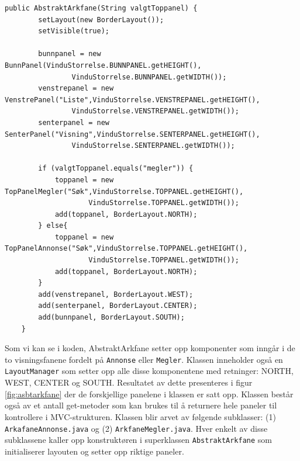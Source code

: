 \begin{lstlisting}[caption=Konstruktør til \texttt{AbstraktArkfane}. label=kode:arkfane]
    public AbstraktArkfane(String valgtToppanel) {
        setLayout(new BorderLayout());
        setVisible(true);
        
        bunnpanel = new BunnPanel(VinduStorrelse.BUNNPANEL.getHEIGHT(), 
                VinduStorrelse.BUNNPANEL.getWIDTH());
        venstrepanel = new VenstrePanel("Liste",VinduStorrelse.VENSTREPANEL.getHEIGHT(), 
                VinduStorrelse.VENSTREPANEL.getWIDTH());
        senterpanel = new SenterPanel("Visning",VinduStorrelse.SENTERPANEL.getHEIGHT(), 
                VinduStorrelse.SENTERPANEL.getWIDTH());

        if (valgtToppanel.equals("megler")) {
            toppanel = new TopPanelMegler("Søk",VinduStorrelse.TOPPANEL.getHEIGHT(), 
                    VinduStorrelse.TOPPANEL.getWIDTH());
            add(toppanel, BorderLayout.NORTH);
        } else{
            toppanel = new TopPanelAnnonse("Søk",VinduStorrelse.TOPPANEL.getHEIGHT(), 
                    VinduStorrelse.TOPPANEL.getWIDTH());
            add(toppanel, BorderLayout.NORTH);
        }
        add(venstrepanel, BorderLayout.WEST);
        add(senterpanel, BorderLayout.CENTER);
        add(bunnpanel, BorderLayout.SOUTH);
    }
\end{lstlisting}



Som vi kan se i koden, AbstraktArkfane setter opp komponenter som inngår i de to visningsfanene fordelt på \texttt{Annonse} eller \texttt{Megler}. Klassen inneholder også en \texttt{LayoutManager} som setter opp alle disse komponentene med retninger: NORTH, WEST, CENTER og SOUTH. Resultatet av dette presenteres i figur \ref{fig:asbtarkfane} der de forskjellige panelene i klassen er satt opp. Klassen består også av et antall get-metoder som kan brukes til å returnere hele paneler til kontrollere i MVC-strukturen. Klassen blir arvet av følgende subklasser: (1) \texttt{ArkafaneAnnonse.java} og (2) \texttt{ArkfaneMegler.java}. Hver enkelt av disse subklassene kaller opp konstruktøren i superklassen \texttt{AbstraktArkfane} som initialiserer layouten og setter opp riktige paneler.




